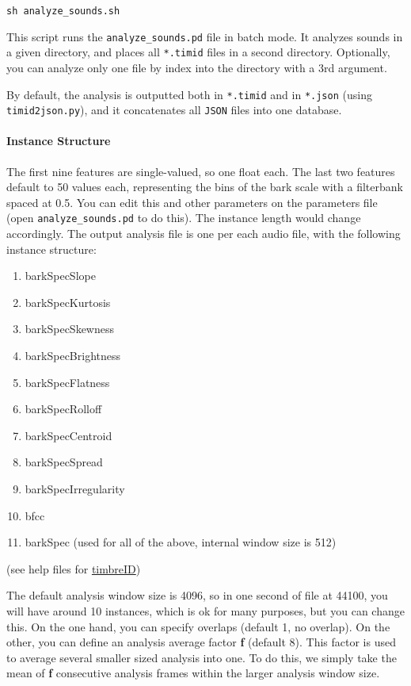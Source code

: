 \texttt{sh\ analyze\_sounds.sh}

This script runs the \texttt{analyze\_sounds.pd} file in batch mode. It analyzes sounds in a given directory, and places all \texttt{*.timid} files in a second directory. Optionally, you can analyze only one file by index into the directory with a 3rd argument.

By default, the analysis is outputted both in \texttt{*.timid} and in \texttt{*.json} (using \texttt{timid2json.py}), and it concatenates all \texttt{JSON} files into one database.

\hypertarget{instance-structure}{%
\paragraph{Instance Structure}\label{instance-structure}}

The first nine features are single-valued, so one float each. The last two features default to 50 values each, representing the bins of the bark scale with a filterbank spaced at 0.5. You can edit this and other parameters on the parameters file (open \texttt{analyze\_sounds.pd} to do this). The instance length would change accordingly. The output analysis file is one per each audio file, with the following instance structure:

\begin{enumerate}
\def\labelenumi{\arabic{enumi}.}
\tightlist
\item
  barkSpecSlope
\item
  barkSpecKurtosis
\item
  barkSpecSkewness
\item
  barkSpecBrightness
\item
  barkSpecFlatness
\item
  barkSpecRolloff
\item
  barkSpecCentroid
\item
  barkSpecSpread
\item
  barkSpecIrregularity
\item
  bfcc
\item
  barkSpec (used for all of the above, internal window size is 512)
\end{enumerate}

(see help files for \href{https://github.com/wbrent/timbreID}{timbreID})

The default analysis window size is 4096, so in one second of file at 44100, you will have around 10 instances, which is ok for many purposes, but you can change this. On the one hand, you can specify overlaps (default 1, no overlap). On the other, you can define an analysis average factor \textbf{f} (default 8). This factor is used to average several smaller sized analysis into one. To do this, we simply take the mean of \textbf{f} consecutive analysis frames within the larger analysis window size.

